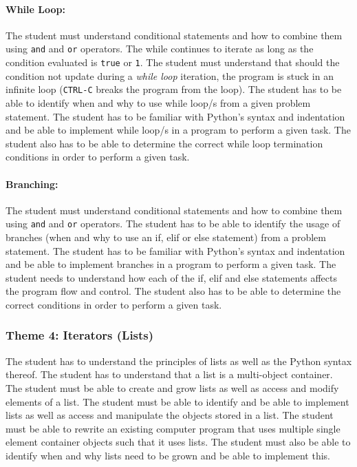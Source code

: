             \paragraph{While Loop:}
            The student must understand conditional statements and how
            to combine them using \texttt{and} and \texttt{or}
            operators. The while continues to iterate as long as the
            condition evaluated is \texttt{true} or \texttt{1}. The
            student must understand that should the condition not
            update during a \textit{while loop} iteration, the program
            is stuck in an infinite loop (\texttt{CTRL-C} breaks the
            program from the loop).  The student has to be able to
            identify when and why to use while loop/s from a given
            problem statement. The student has to be familiar with
            Python's syntax and indentation and be able to implement
            while loop/s in a program to perform a given task.  The
            student also has to be able to determine the correct while
            loop termination conditions in order to perform a given
            task.

            \paragraph{Branching:}
            The student must understand conditional statements and how
            to combine them using \texttt{and} and \texttt{or}
            operators. The student has to be able to identify the
            usage of branches (when and why to use an if, elif or else
            statement) from a problem statement. The student has to be
            familiar with Python's syntax and indentation and be able
            to implement branches in a program to perform a given
            task. The student needs to understand how each of the if,
            elif and else statements affects the program flow and
            control. The student also has to be able to determine the
            correct conditions in order to perform a given task.

        \subsubsection{Theme 4: Iterators (Lists)}
        The student has to understand the principles of lists as well
        as the Python syntax thereof. The student has to understand
        that a list is a multi-object container. The student must be
        able to create and grow lists as well as access and modify
        elements of a list.  The student must be able to identify and
        be able to implement lists as well as access and manipulate
        the objects stored in a list. The student must be able to
        rewrite an existing computer program that uses multiple single
        element container objects such that it uses lists. The student
        must also be able to identify when and why lists need to be
        grown and be able to implement this.

